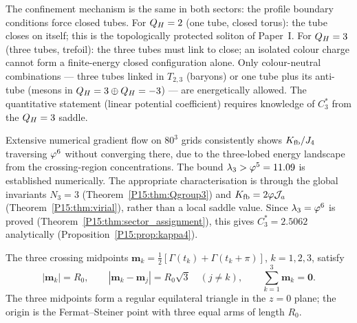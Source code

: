 \begin{remark}[Q$_H$=2 vs Q$_H$=3 confinement]
\label{P15:rem:qh2_vs_qh3_confinement}
The confinement mechanism is the same in both sectors:
the profile boundary conditions force closed tubes.
For $Q_H=2$ (one tube, closed torus): the tube closes on itself;
this is the topologically protected soliton of Paper~I.
For $Q_H=3$ (three tubes, trefoil): the three tubes must link to
close; an isolated colour charge cannot form a finite-energy
closed configuration alone.
Only colour-neutral combinations --- three tubes linked in
$T_{2,3}$ (baryons) or one tube plus its anti-tube (mesons in
$Q_H=3\oplus Q_H=-3$) --- are energetically allowed.
The quantitative statement (linear potential coefficient) requires
knowledge of $C^*_3$ from the $Q_H=3$ saddle.
\end{remark}

\begin{remark}
\label{P15:rem:no_lambda3}
Extensive numerical gradient flow on $80^3$ grids consistently shows
$K_{\mathrm{fb}}/J_4$ traversing $\varphi^6$ without converging there, due to the
three-lobed energy landscape from the crossing-region concentrations.
The bound $\lambda_3>\varphi^5=11.09$ is established numerically.
The appropriate characterisation is through the global invariants
$N_3=3$ (Theorem~\ref{P15:thm:Qgroup3}) and $K_{\mathrm{fb}}=2\varphi\mathcal{J}_a$
(Theorem~\ref{P15:thm:virial}), rather than a local saddle value.
Since $\lambda_3=\varphi^6$ is proved (Theorem~\ref{P15:thm:sector_assignment}),
this gives $C_3^*=2.5062$ analytically (Proposition~\ref{P15:prop:kappa4}).
\end{remark}

\begin{proposition}
\label{P15:prop:yjunction}
The three crossing midpoints
$\mathbf{m}_k = \tfrac{1}{2}[\Gamma(t_k)+\Gamma(t_k+\pi)]$,
$k=1,2,3$, satisfy
\begin{equation}
  |\mathbf{m}_k| = R_0,\qquad
  |\mathbf{m}_k - \mathbf{m}_j| = R_0\sqrt{3}\quad(j\neq k),\qquad
  \sum_{k=1}^3 \mathbf{m}_k = \mathbf{0}.
  \label{P15:eq:yjunction}
\end{equation}
The three midpoints form a regular equilateral triangle in the $z=0$
plane; the origin is the Fermat--Steiner point with three equal arms
of length $R_0$.
\end{proposition}


